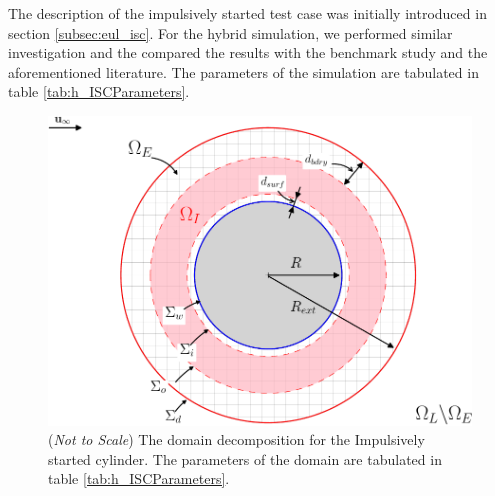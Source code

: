 The description of the impulsively started test case was initially introduced in section \ref{subsec:eul_isc}. For the hybrid simulation, we performed similar investigation and the compared the results with the benchmark study and the aforementioned literature. The parameters of the simulation are tabulated in table \ref{tab:h_ISCParameters}. 
	\begin{figure}[!p]
	\centering
	\includegraphics[width=0.6\linewidth]{./figures/validation/isc/hisc_dd-crop.pdf}
	\caption{(\textit{Not to Scale}) The domain decomposition for the Impulsively started cylinder. The parameters of the domain are tabulated in table \ref{tab:h_ISCParameters}.}
	\label{fig:hisc_dd}
	\end{figure}

